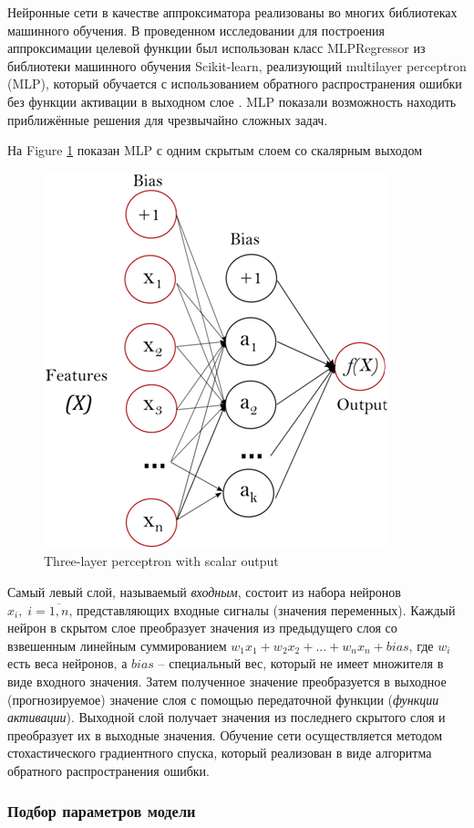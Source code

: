 \documentclass[sensors,article,submit,moreauthors,pdftex]{Definitions/mdpi}
\begin{document}
Нейронные сети в качестве аппроксиматора реализованы во многих библиотеках машинного обучения. 
В проведенном исследовании для построения аппроксимации целевой функции был использован класс MLPRegressor из библиотеки машинного обучения Scikit-learn, реализующий multilayer perceptron (MLP), который обучается с использованием обратного распространения ошибки без функции активации в выходном слое \cite{Nielsen1989}. MLP показали возможность находить приближённые решения для чрезвычайно сложных задач.

На Figure \ref{fig1} показан MLP с одним скрытым слоем со скалярным выходом

\begin{figure}[H]
\begin{center}
\includegraphics[width=0.5\linewidth]{perceptron.png}
\caption{Three-layer perceptron with scalar output}
\label{fig1}
\end{center}
\end{figure}   

Самый левый слой, называемый \textit{входным}, состоит из набора нейронов $x_i, \; i=\overline{1,n}$, представляющих входные сигналы (значения переменных). Каждый нейрон в скрытом слое преобразует значения из предыдущего слоя со взвешенным линейным суммированием $w_1 x_1 + w_2 x_2+...+w_n x_n+bias$, где $w_i$ есть веса нейронов, а $bias$ -- специальный вес, который не имеет множителя в виде входного значения. Затем полученное значение преобразуется в выходное (прогнозируемое) значение слоя с помощью передаточной функции (\textit{функции активации}). Выходной слой получает значения из последнего скрытого слоя и преобразует их в выходные значения. Обучение сети осуществляется методом стохастического градиентного спуска, который реализован в виде алгоритма обратного распространения ошибки.

\subsubsection{Подбор параметров модели}
\end{document}
